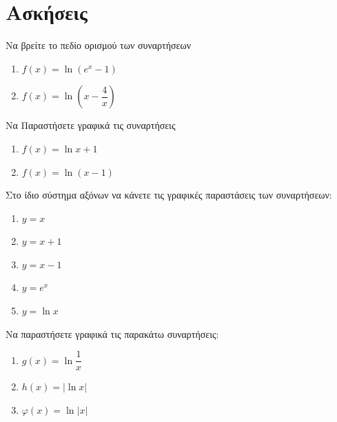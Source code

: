 \documentclass{../presentation}
\begin{document}
\section{Ασκήσεις}
\begin{askisi}
  Να βρείτε το πεδίο ορισμού των συναρτήσεων
  \begin{enumerate}
    \item<1-> $f(x)=\ln (e^x-1)$
    \item<2-> $f(x)=\ln \left( x-\dfrac{4}{x} \right) $
  \end{enumerate}


\end{askisi}

\begin{askisi}
  Να Παραστήσετε γραφικά τις συναρτήσεις
  \begin{enumerate}
    \item<1-> $f(x)=\ln x+1$
    \item<2-> $f(x)=\ln (x-1)$
  \end{enumerate}


\end{askisi}

\begin{askisi}
  Στο ίδιο σύστημα αξόνων να κάνετε τις γραφικές παραστάσεις των συναρτήσεων:
  \begin{enumerate}
    \item $y=x$
    \item $y=x+1$
    \item $y=x-1$
    \item $y=e^x$
    \item $y=\ln x$
  \end{enumerate}


\end{askisi}

\begin{askisi}
  Να παραστήσετε γραφικά τις παρακάτω συναρτήσεις:
  \begin{enumerate}
    \item<1-> $g(x)=\ln \dfrac{1}{x}$
    \item<2-> $h(x)=|\ln x|$
    \item<3-> $φ(x)=\ln |x|$
  \end{enumerate}


\end{askisi}
\end{document}
